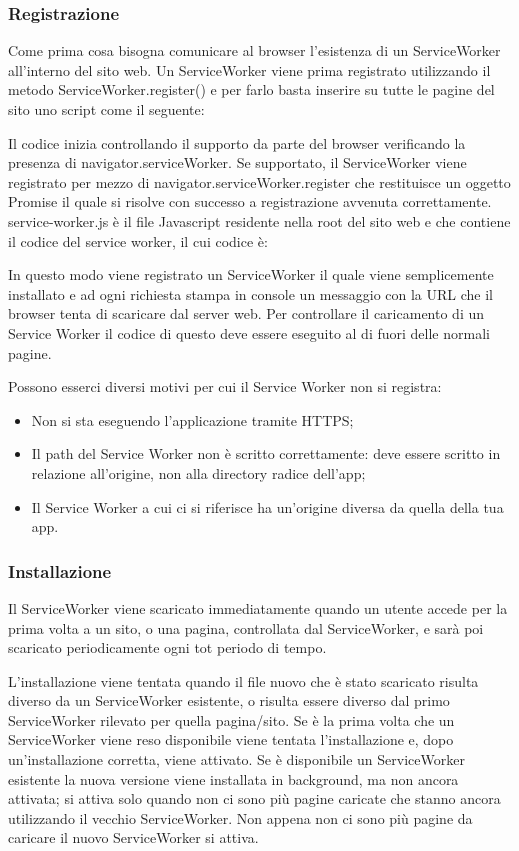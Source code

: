 \documentclass[11pt ,a4paper , twoside , openright ]{article}
\begin{document}
\subsubsection{Registrazione}

Come prima cosa bisogna comunicare al browser l’esistenza di un ServiceWorker all’interno del sito web. Un ServiceWorker viene prima registrato utilizzando il metodo ServiceWorker.register() e per farlo basta inserire su tutte le pagine del sito uno script come il seguente:

Il codice inizia controllando il supporto da parte del browser verificando la presenza di navigator.serviceWorker. Se supportato, il ServiceWorker viene registrato per mezzo di navigator.serviceWorker.register che restituisce un oggetto Promise il quale si risolve con successo a registrazione avvenuta correttamente.
service-worker.js è il file Javascript residente nella root del sito web e che contiene il codice del service worker, il cui codice è:

In questo modo viene registrato un ServiceWorker il quale viene semplicemente installato e ad ogni richiesta stampa in console un messaggio con la URL che il browser tenta di scaricare dal server web. Per controllare il caricamento di un Service Worker il codice di questo deve essere eseguito al di fuori delle normali pagine.

Possono esserci diversi motivi per cui il Service Worker non si registra:
\begin{itemize}
	\item Non si sta eseguendo l'applicazione tramite HTTPS;
	\item Il path del Service Worker non è scritto correttamente: deve essere scritto in relazione all'origine, non alla directory radice dell'app;
	\item Il Service Worker a cui ci si riferisce ha un'origine diversa da quella della tua app.
\end{itemize}

\subsubsection{Installazione}
Il ServiceWorker viene scaricato immediatamente quando un utente accede per la prima volta a un sito, o una pagina, controllata dal ServiceWorker, e sarà poi scaricato periodicamente ogni tot periodo di tempo.

L'installazione viene tentata quando il file nuovo che è stato scaricato risulta diverso da un ServiceWorker esistente, o risulta essere diverso dal primo ServiceWorker rilevato per quella pagina/sito. Se è la prima volta che un ServiceWorker viene reso disponibile viene tentata l'installazione e, dopo un'installazione corretta, viene attivato. Se è disponibile un ServiceWorker esistente la nuova versione viene installata in background, ma non ancora attivata; si attiva solo quando non ci sono più pagine caricate che stanno ancora utilizzando il vecchio ServiceWorker. Non appena non ci sono più pagine da caricare il nuovo ServiceWorker si attiva.
\end{document}
